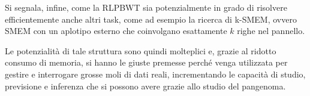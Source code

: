 \documentclass[a4paper,11pt, oneside,italian]{article}
\begin{document}
Si segnala, infine, come la RLPBWT sia potenzialmente in grado di
risolvere 
efficientemente anche altri task, come ad esempio la ricerca di k-SMEM,
ovvero SMEM con un aplotipo esterno che coinvolgano
esattamente $k$ righe nel pannello.

Le potenzialità di tale struttura sono quindi molteplici e, grazie al ridotto
consumo di memoria, si hanno le giuste premesse perché venga utilizzata per
gestire e interrogare grosse moli di dati reali, incrementando le capacità di
studio, previsione e inferenza che si possono avere grazie allo studio del
pangenoma.
\end{document}
